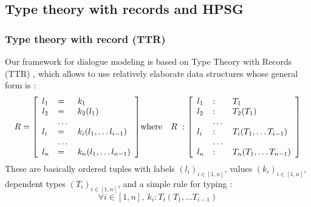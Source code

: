 \documentclass[11pt]{article}
\begin{document}
		

		\subsection{Type theory with records and HPSG}
			\subsubsection{Type theory with record (TTR)}
				Our framework for dialogue modeling is based on Type Theory with Records (TTR) \cite{betarte98}, which allows to use relatively elaborate data structures whose general form is :
				\begin{eqnarray}
					R = \left[
					\begin{array}{l l l}
					l_1 &=& k_1 \\
					l_2 &=& k_2(l_1) \\
					&\dots& \\
					l_i &=& k_i(l_1, \dots l_{i-1}) \\
					&\dots& \\
					l_n &=& k_n(l_1, \dots l_{n-1})
					\end{array}
					\right]
					&\mbox{where}&
					R \ : \left[
					\begin{array}{l l l}
					l_1 &:& T_1 \\
					l_2 &:& T_2(T_1) \\
					&\dots& \\
					l_i &:& T_i(T_1, \dots T_{i-1}) \\
					&\dots& \\
					l_n &:& T_n(T_1, \dots T_{n-1})
					\end{array}
					\right]
					\label{record_def}
				\end{eqnarray}
				These are basically ordered tuples with labels $(l_i)_{i\in[1, n]}$, values $(k_i)_{i\in[1, n]}$, dependent types $(T_i)_{i\in[1, n]}$, and a simple rule for typing :
				\begin{equation*}
					\forall i \in [1, n], \ k_i : T_i(T_1, \dots T_{i-1})
					\label{record_typing}
				\end{equation*}
\end{document}
